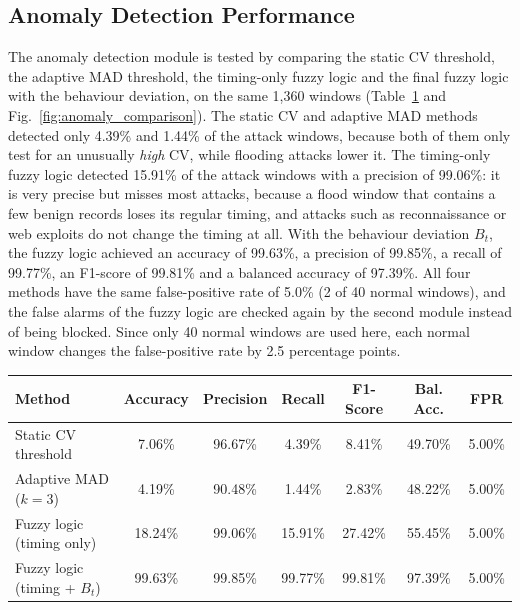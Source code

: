 \documentclass[]{interact}
\theoremstyle{plain}%
\theoremstyle{definition}
\theoremstyle{remark}
\begin{document}
\subsection{Anomaly Detection Performance}
The anomaly detection module is tested by comparing the static CV threshold, the adaptive MAD threshold, the timing-only fuzzy logic and the final fuzzy logic with the behaviour deviation, on the same 1,360 windows (Table~\ref{tab:anomaly_performance} and Fig.~\ref{fig:anomaly_comparison}). The static CV and adaptive MAD methods detected only 4.39\% and 1.44\% of the attack windows, because both of them only test for an unusually \emph{high} CV, while flooding attacks lower it. The timing-only fuzzy logic detected 15.91\% of the attack windows with a precision of 99.06\%: it is very precise but misses most attacks, because a flood window that contains a few benign records loses its regular timing, and attacks such as reconnaissance or web exploits do not change the timing at all. With the behaviour deviation $B_t$, the fuzzy logic achieved an accuracy of 99.63\%, a precision of 99.85\%, a recall of 99.77\%, an F1-score of 99.81\% and a balanced accuracy of 97.39\%. All four methods have the same false-positive rate of 5.0\% (2 of 40 normal windows), and the false alarms of the fuzzy logic are checked again by the second module instead of being blocked. Since only 40 normal windows are used here, each normal window changes the false-positive rate by 2.5 percentage points.

\begin{table}[htbp]
{\begin{tabular}{lcccccc}
\toprule
\textbf{Method} & \textbf{Accuracy} & \textbf{Precision} & \textbf{Recall} & \textbf{F1-Score} & \textbf{Bal. Acc.} & \textbf{FPR} \\
\midrule
Static CV threshold          & 7.06\%  & 96.67\% & 4.39\%  & 8.41\%  & 49.70\% & 5.00\% \\
Adaptive MAD ($k=3$)         & 4.19\%  & 90.48\% & 1.44\%  & 2.83\%  & 48.22\% & 5.00\% \\
Fuzzy logic (timing only)    & 18.24\% & 99.06\% & 15.91\% & 27.42\% & 55.45\% & 5.00\% \\
Fuzzy logic (timing + $B_t$) & 99.63\% & 99.85\% & 99.77\% & 99.81\% & 97.39\% & 5.00\% \\
\bottomrule
\end{tabular}}
\label{tab:anomaly_performance}
\end{table}
\end{document}
